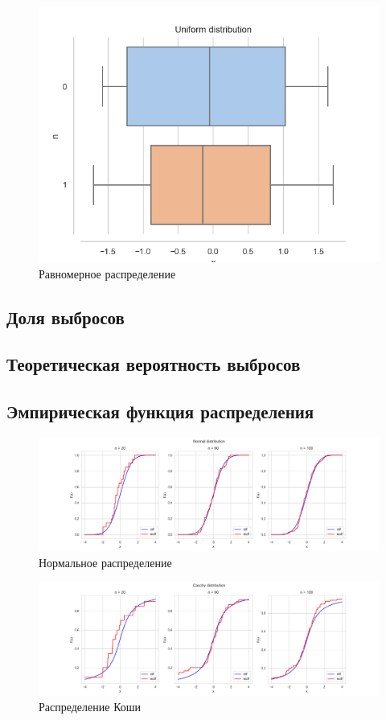 \documentclass[a4paper,14pt]{article}
\begin{document}
	\begin{figure}[H]
		\centering
		\includegraphics[scale=0.6]{../image/lab3/lab3_uniform.png}
		\caption{Равномерное распределение}
		\label{fig:uniform}
	\end{figure}
	\subsection{Доля выбросов}
	\subsection{Теоретическая вероятность выбросов}
	\subsection{Эмпирическая функция распределения}
	\begin{figure}[H]
		\centering
		\includegraphics[scale=0.35]{../image/lab4/lab4_ecdf_norm.png}
		\caption{Нормальное распределение}
	\end{figure}
	
	\begin{figure}[H]
		\centering
		\includegraphics[scale=0.35]{../image/lab4/lab4_ecdf_cauchy.png}
		\caption{Распределение Коши}
	\end{figure}
	
\end{document}
